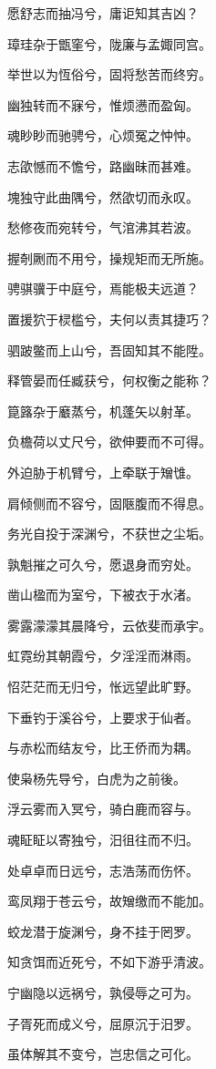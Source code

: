 \documentclass[12pt,a4paper]{ctexbook}
\begin{document}
愿舒志而抽冯兮，庸讵知其吉凶？\par
璋珪杂于甑窐兮，陇廉与孟娵同宫。\par
举世以为恆俗兮，固将愁苦而终穷。\par
幽独转而不寐兮，惟烦懑而盈匈。\par
魂眇眇而驰骋兮，心烦冤之忡忡。\par
志欿憾而不憺兮，路幽昧而甚难。\par
塊独守此曲隅兮，然欿切而永叹。\par
愁修夜而宛转兮，气涫沸其若波。\par
握剞劂而不用兮，操规矩而无所施。\par
骋骐骥于中庭兮，焉能极夫远道？\par
置援狖于棂槛兮，夫何以责其捷巧？\par
驷跛鳖而上山兮，吾固知其不能陞。\par
释管晏而任臧获兮，何权衡之能称？\par
箟簬杂于黀蒸兮，机蓬矢以射革。\par
负檐荷以丈尺兮，欲伸要而不可得。\par
外迫胁于机臂兮，上牵联于矰隿。\par
肩倾侧而不容兮，固陿腹而不得息。\par
务光自投于深渊兮，不获世之尘垢。\par
孰魁摧之可久兮，愿退身而穷处。\par
凿山楹而为室兮，下被衣于水渚。\par
雾露濛濛其晨降兮，云依斐而承宇。\par
虹霓纷其朝霞兮，夕淫淫而淋雨。\par
怊茫茫而无归兮，怅远望此旷野。\par
下垂钓于溪谷兮，上要求于仙者。\par
与赤松而结友兮，比王侨而为耦。\par
使枭杨先导兮，白虎为之前後。\par
浮云雾而入冥兮，骑白鹿而容与。\par
魂眐眐以寄独兮，汨徂往而不归。\par
处卓卓而日远兮，志浩荡而伤怀。\par
鸾凤翔于苍云兮，故矰缴而不能加。\par
蛟龙潜于旋渊兮，身不挂于罔罗。\par
知贪饵而近死兮，不如下游乎清波。\par
宁幽隐以远祸兮，孰侵辱之可为。\par
子胥死而成义兮，屈原沉于汨罗。\par
虽体解其不变兮，岂忠信之可化。\par
\end{document}
